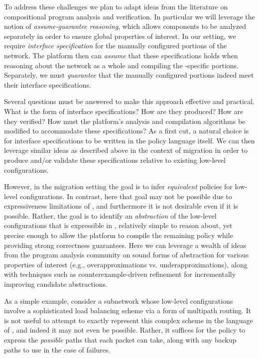 To address these challenges we plan to adapt ideas from the literature on compositional program analysis and verification.  In particular we will leverage the notion of {\em assume-guarantee reasoning}, which allows components to be analyzed separately in order to ensure global properties of interest.  In our setting, we require {\em interface specification} for the manually configured portions of the network.  The \Propane platform then can {\em assume} that these specifications holds when reasoning about the network as a whole and compiling the \Propane-specific portions.  Separately, we must {\em guarantee} that the manually configured portions indeed meet their interface specifications.

Several questions must be answered to make this approach effective and practical.  What is the form of interface specifications?  How are they produced?  How are they verified?  How must the \Propane platform's analysis and compilation algorithms be modified to accommodate these specifications?  As a first cut, a natural choice is for interface specifications to be written in the \Propane policy language itself.  We can then leverage similar ideas as described above in the context of migration in order to produce and/or validate these specifications relative to existing low-level configurations.  

However, in the migration setting the goal is to infer {\em equivalent} \Propane policies for low-level configurations.  In contrast, here that goal may not be possible due to expressiveness limitations of \Propane, and furthermore it is not desirable even if it is possible. Rather, 
the goal is to identify an 
{\em abstraction} of the low-level configurations that is expressible in \Propane, relatively simple to reason about, yet precise enough to allow the platform to compile the remaining \Propane policy while providing strong correctness guarantees.  Here we can leverage a wealth of ideas from the program analysis community on sound forms of abstraction for various properties of interest (e.g., overapproximations vs. underapproximations), along with techniques such as counterexample-driven refinement for incrementally improving candidate abstractions.


As a simple example, consider a subnetwork whose low-level configurations involve a sophisticated load balancing scheme via a form of multipath routing.  It is not useful to attempt to exactly represent this complex scheme in the language of \Propane, and indeed it may not even be possible.  Rather, it suffices for the \Propane policy to express the {\em possible} paths that each packet can take, along with any backup paths to use in the case of failures.

